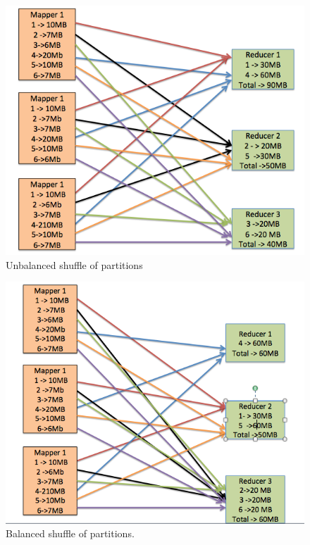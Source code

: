  \begin{figure}[h]
\begin{center}
\includegraphics[scale=1.0]{./img/shuffle_unbalanced.png}
\caption{Unbalanced shuffle of partitions} 
\label{fig:shuffle_unbalanced.png}
\end{center}
\end{figure}

 \begin{figure}[h]
\begin{center}
\includegraphics[scale=1.0]{./img/shuffle_balanced.png}
\caption{Balanced shuffle of partitions.}
\label{fig:shuffle_balanced.png}
\end{center}
\end{figure}

